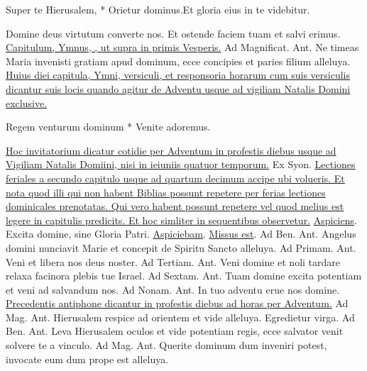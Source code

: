 \begin{multicols*}{2}
\begin{responsory-breve}
{Super te Hierusalem, * Orietur dominus.}{Et gloria eius in te videbitur.}
\end{responsory-breve}
\V Domine deus virtutum converte nos. \R Et ostende faciem tuam et salvi erimus.
 \ul{Capitulum, Ymnus, \Vbar, ut supra in primis Vesperis.} {\color{Red} Ad Magnificat. Ant.} Ne timeas Maria invenisti gratiam apud dominum, ecce concipies et paries filium alleluya. 
\newline \ul{Huius diei capitula, Ymni, versiculi, et responsoria horarum cum suis versiculis dicantur suis locis quando agitur de Adventu usque ad vigiliam Natalis Domini exclusive.}
\begin{invitatory}
{Regem venturum dominum * Venite adoremus.}
\end{invitatory}
\newline \ul{Hoc invitatorium dicatur cotidie per Adventum in profestis diebus usque ad Vigiliam Natalis Domiini, nisi in ieiuniis quatuor temporum.} \V Ex Syon.
\newline \ul{Lectiones feriales a secundo capitulo usque ad quartum decimum accipe ubi volueris. Et nota quod illi qui non habent Biblias possunt repetere per ferias lectiones dominicales prenotatas. Qui vero habent possunt repetere vel quod melius est legere in capitulis predicits. Et hoc simliter in sequentibus observetur.}
\R \hyperlink{aspiciens}{Aspiciens}. \V Excita domine, sine Gloria Patri. \R \hyperlink{aspiciebam}{Aspiciebam}. \R \hyperlink{missus-est}{Missus est}. {\color{Red} Ad Ben. Ant.} Angelus domini nunciavit Marie et concepit de Spiritu Sancto alleluya. {\color{Red} Ad Primam. Ant.} Veni et libera nos deus noster. {\color{Red} Ad Tertiam. Ant.} Veni domine et noli tardare relaxa facinora plebis tue Israel. {\color{Red} Ad Sextam. Ant.} Tuam domine excita potentiam et veni ad salvandum nos. {\color{Red} Ad Nonam. Ant.} In tuo adventu erue nos domine.
\newline \ul{Precedentis antiphone dicantur in profestis diebus ad horas per Adventum.} {\color{Red} Ad Mag. Ant.} Hierusalem respice ad orientem et vide alleluya.
 \V Egredietur virga. {\color{Red} Ad Ben. Ant.} Leva Hierusalem oculos et vide potentiam regis, ecce salvator venit solvere te a vinculo. {\color{Red} Ad Mag. Ant.} Querite dominum dum inveniri potest, invocate eum dum prope est alleluya.

\end{multicols*}

